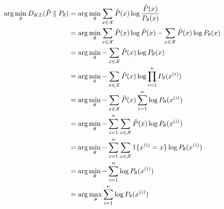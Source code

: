 \begin{answer}
    \begin{align*}
        \arg\min_\theta D_{KL}(\hat{P} \parallel P_\theta) &= \arg\min_\theta \sum_{x \in \mathcal{X}} \hat{P}(x) \log \frac{\hat{P}(x)}{P_\theta(x)} \\
        &= \arg\min_\theta \sum_{x \in \mathcal{X}} \hat{P}(x) \log \hat{P}(x) - \sum_{x \in \mathcal{X}} \hat{P}(x) \log P_\theta(x) \\
        &= \arg\min_\theta - \sum_{x \in \mathcal{X}} \hat{P}(x) \log P_\theta(x) \\
        &= \arg\min_\theta - \sum_{x \in \mathcal{X}} \hat{P}(x) \log \prod_{i=1}^n P_\theta(x^{(i)}) \\
        &= \arg\min_\theta - \sum_{x \in \mathcal{X}} \hat{P}(x) \sum_{i=1}^n \log P_\theta(x^{(i)}) \\
        &= \arg\min_\theta - \sum_{i=1}^n \sum_{x \in \mathcal{X}} \hat{P}(x) \log P_\theta(x^{(i)}) \\
        &= \arg\min_\theta - \sum_{i=1}^n \sum_{x \in \mathcal{X}} 1\{x^{(i)}=x\} \log P_\theta(x^{(i)}) \\
        &= \arg\min_\theta - \sum_{i=1}^n \log P_\theta(x^{(i)}) \\
        &= \arg\max_\theta \sum_{i=1}^n \log P_\theta(x^{(i)})
    \end{align*}
\end{answer}
